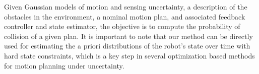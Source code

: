 Given Gaussian models of motion and sensing uncertainty, a description of the obstacles in the environment, a nominal motion plan, and associated feedback controller and state estimator, the objective is to compute the probability of collision of a given plan. It is important to note that our method can be directly used for estimating the a priori distributions of the robot's state over time with hard state constraints, which is a key step in several optimization based methods for motion planning under uncertainty. 